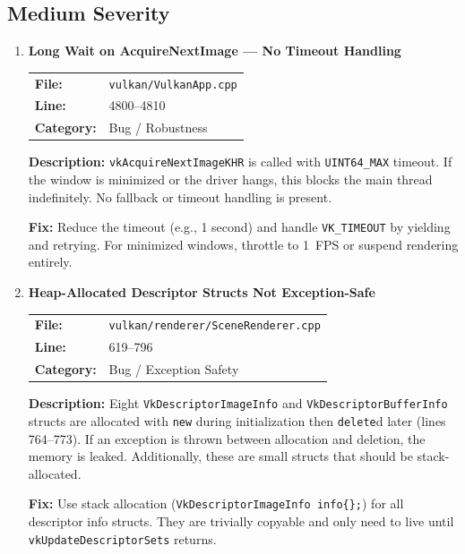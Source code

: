 \documentclass[a4paper,12pt]{article}
\newcommand{\severitybox}[2]{%
  \colorbox{#1}{\makebox[2.5cm][c]{\textcolor{white}{\textbf{#2}}}}%
}
\begin{document}
\subsection{Medium Severity}

\begin{enumerate}[leftmargin=*]

\item[\textbf{[B4]}] \textbf{Long Wait on AcquireNextImage — No Timeout Handling}
  \hfill \severitybox{mediumcolor}{MEDIUM}

  \begin{tabular}{ll}
    \textbf{File:} & \texttt{vulkan/VulkanApp.cpp} \\
    \textbf{Line:} & 4800--4810 \\
    \textbf{Category:} & Bug / Robustness \\
  \end{tabular}

  \textbf{Description:}
  \texttt{vkAcquireNextImageKHR} is called with \texttt{UINT64\_MAX} timeout.
  If the window is minimized or the driver hangs, this blocks the main thread
  indefinitely. No fallback or timeout handling is present.

  \textbf{Fix:}
  Reduce the timeout (e.g., 1 second) and handle
  \texttt{VK\_TIMEOUT} by yielding and retrying. For minimized windows,
  throttle to 1~FPS or suspend rendering entirely.

\item[\textbf{[B5]}] \textbf{Heap-Allocated Descriptor Structs Not Exception-Safe}
  \hfill \severitybox{mediumcolor}{MEDIUM}

  \begin{tabular}{ll}
    \textbf{File:} & \texttt{vulkan/renderer/SceneRenderer.cpp} \\
    \textbf{Line:} & 619--796 \\
    \textbf{Category:} & Bug / Exception Safety \\
  \end{tabular}

  \textbf{Description:}
  Eight \texttt{VkDescriptorImageInfo} and \texttt{VkDescriptorBufferInfo}
  structs are allocated with \texttt{new} during initialization then
  \texttt{delete}d later (lines 764--773). If an exception is thrown between
  allocation and deletion, the memory is leaked. Additionally, these are
  small structs that should be stack-allocated.

  \textbf{Fix:}
  Use stack allocation (\texttt{VkDescriptorImageInfo info\{\};}) for all
  descriptor info structs. They are trivially copyable and only need to
  live until \texttt{vkUpdateDescriptorSets} returns.


\end{enumerate}
\end{document}
